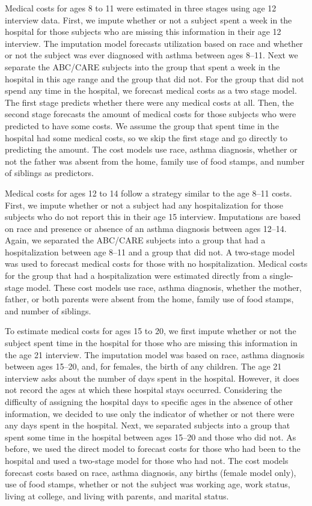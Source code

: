\noindent Medical costs for ages 8 to 11 were estimated in three stages using age 12 interview data. First, we impute whether or not a subject spent a week in the hospital for those subjects who are missing this information in their age 12 interview. The imputation model forecasts utilization based on race and whether or not the subject was ever diagnosed with asthma between ages 8--11. Next we separate the ABC/CARE subjects into the group that spent a week in the hospital in this age range and the group that did not. For the group that did not spend any time in the hospital, we forecast medical costs as a two stage model. The first stage predicts whether there were any medical costs at all. Then, the second stage forecasts the amount of medical costs for those subjects who were predicted to have some costs. We assume the group that spent time in the hospital had some medical costs, so we skip the first stage and go directly to predicting the amount. The cost models use race, asthma diagnosis, whether or not the father was absent from the home, family use of food stamps, and number of siblings as predictors.

\noindent Medical costs for ages 12 to 14 follow a strategy similar to the age 8--11 costs. First, we impute whether or not a subject had any hospitalization for those subjects who do not report this in their age 15 interview. Imputations are based on race and presence or absence of an asthma diagnosis between ages 12--14. Again, we separated the ABC/CARE subjects into a group that had a hospitalization between age 8--11 and a group that did not. A two-stage model was used to forecast medical costs for those with no hospitalization. Medical costs for the group that had a hospitalization were estimated directly from a single-stage model. These cost models use race, asthma diagnosis, whether the mother, father, or both parents were absent from the home, family use of food stamps, and number of siblings.

\noindent To estimate medical costs for ages 15 to 20, we first impute whether or not the subject spent time in the hospital for those who are missing this information in the age 21 interview. The imputation model was based on race, asthma diagnosis between ages 15--20, and, for females, the birth of any children. The age 21 interview asks about the number of days spent in the hospital. However, it does not record the ages at which these hospital stays occurred. Considering the difficulty of assigning the hospital days to specific ages in the absence of other information, we decided to use only the indicator of whether or not there were any days spent in the hospital. Next, we separated subjects into a group that spent some time in the hospital between ages 15--20 and those who did not. As before, we used the direct model to forecast costs for those who had been to the hospital and used a two-stage model for those who had not. The cost models forecast costs based on race, asthma diagnosis, any births (female model only), use of food stamps, whether or not the subject was working age, work status, living at college, and living with parents, and marital status.


